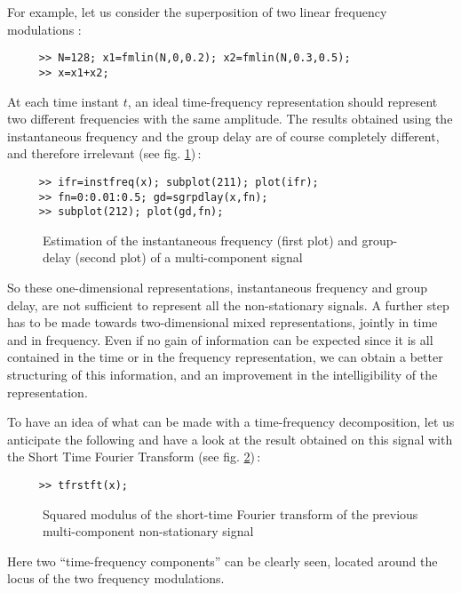 For example, let us consider the superposition of two linear frequency
modulations :
\begin{verbatim}
     >> N=128; x1=fmlin(N,0,0.2); x2=fmlin(N,0.3,0.5);
     >> x=x1+x2;
\end{verbatim}
At each time instant $t$, an ideal time-frequency representation should
represent two different frequencies with the same amplitude. The results
obtained using the instantaneous frequency and the group delay are of
course completely different, and therefore irrelevant (see
fig. \ref{Ns7fig1})\,: 
\begin{verbatim}
     >> ifr=instfreq(x); subplot(211); plot(ifr);
     >> fn=0:0.01:0.5; gd=sgrpdlay(x,fn); 
     >> subplot(212); plot(gd,fn);
\end{verbatim}
\begin{figure}[htb]
\epsfxsize=10cm
\epsfysize=6cm
\centerline{}
\caption{\label{Ns7fig1}Estimation of the instantaneous frequency (first
plot) and group-delay (second plot) of a multi-component signal}
\end{figure}
So these one-dimensional representations, instantaneous frequency and group
delay, are not sufficient to represent all the non-stationary signals. A
further step has to be made towards two-dimensional mixed representations,
jointly in time and in frequency. Even if no gain of information can be
expected since it is all contained in the time or in the frequency
representation, we can obtain a better structuring of this information, and
an improvement in the intelligibility of the representation.

  To have an idea of what can be made with a time-frequency decomposition,
let us anticipate the following and have a look at the result obtained on
this signal with the Short Time Fourier Transform (see
fig. \ref{Ns7fig2})\,:
\begin{verbatim}
     >> tfrstft(x);
\end{verbatim}
\begin{figure}[htb]
\epsfxsize=10cm
\epsfysize=8cm
\centerline{}
\caption{\label{Ns7fig2}Squared modulus of the short-time Fourier transform
of the previous multi-component non-stationary signal}
\end{figure}
Here two ``time-frequency components'' can be clearly seen, located around
the locus of the two frequency modulations.

